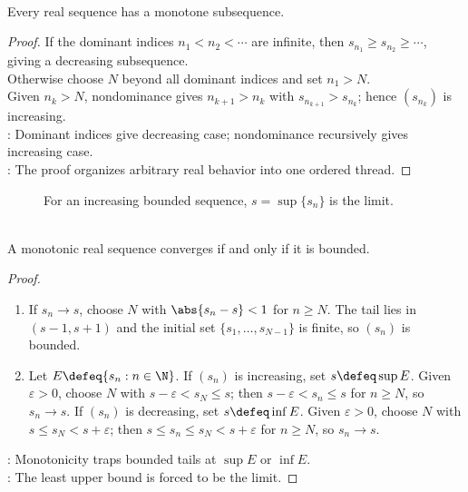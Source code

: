 \begin{theorem} \label{thm:monotone-subsequence-theorem} \\
Every real sequence has a monotone subsequence.
\begin{proof}
If the dominant indices $n_1<n_2<\cdots$ are infinite, then $s_{n_1}\geq s_{n_2}\geq\cdots$, giving a decreasing subsequence.\\
Otherwise choose $N$ beyond all dominant indices and set $n_1>N$.\\
Given $n_k>N$, nondominance gives $n_{k+1}>n_k$ with $s_{n_{k+1}}>s_{n_k}$; hence $(s_{n_k})$ is increasing.\\
: Dominant indices give decreasing case; nondominance recursively gives increasing case.\\
: The proof organizes arbitrary real behavior into one ordered thread.
\end{proof}
\end{theorem}

\begin{figure}[H]
  \centering
  
  \caption{For an increasing bounded sequence, $s=\sup\{s_n\}$ is the limit.}
  \label{fig:monotone-convergence-supremum}
\end{figure}

\begin{theorem} \label{thm:monotone-convergence} \\
A monotonic real sequence converges if and only if it is bounded.
\begin{proof}
\begin{enumerate}[label=\roman*.]
\setlength{\itemsep}{0pt}
\item[$(\Rightarrow)$] If $s_n\to s$, choose $N$ with $\abs{s_n-s}<1$ for $n\geq N$. The tail lies in $(s-1,s+1)$ and the initial set $\{s_1,\ldots,s_{N-1}\}$ is finite, so $(s_n)$ is bounded.
\item[$(\Leftarrow)$] Let $E\defeq\{s_n:n\in\N\}$. If $(s_n)$ is increasing, set $s\defeq\sup E$. Given $\varepsilon>0$, choose $N$ with $s-\varepsilon<s_N\leq s$; then $s-\varepsilon<s_n\leq s$ for $n\geq N$, so $s_n\to s$. If $(s_n)$ is decreasing, set $s\defeq\inf E$. Given $\varepsilon>0$, choose $N$ with $s\leq s_N<s+\varepsilon$; then $s\leq s_n\leq s_N<s+\varepsilon$ for $n\geq N$, so $s_n\to s$.
\end{enumerate}
: Monotonicity traps bounded tails at $\sup E$ or $\inf E$.\\
: The least upper bound is forced to be the limit.
\end{proof}
\end{theorem}


